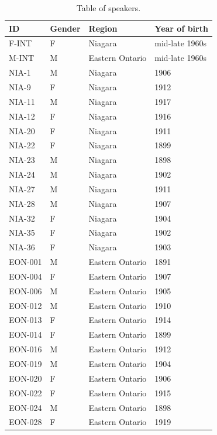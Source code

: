\documentclass[11pt]{article}
\begin{document}
\begin{table}[ht!]
    \centering
    \begin{tabular}{llll}
        \toprule
        ID & Gender & Region  & Year of birth \\
        \midrule
        F-INT   & F & Niagara         & mid-late 1960s \\
        M-INT   & M & Eastern Ontario & mid-late 1960s \\
        NIA-1   & M & Niagara         & 1906    \\
        NIA-9   & F & Niagara         & 1912    \\
        NIA-11  & M & Niagara         & 1917    \\
        NIA-12  & F & Niagara         & 1916    \\
        NIA-20  & F & Niagara         & 1911    \\
        NIA-22  & F & Niagara         & 1899    \\
        NIA-23  & M & Niagara         & 1898    \\
        NIA-24  & M & Niagara         & 1902    \\
        NIA-27  & M & Niagara         & 1911    \\
        NIA-28  & M & Niagara         & 1907    \\
        NIA-32  & F & Niagara         & 1904    \\
        NIA-35  & F & Niagara         & 1902    \\
        NIA-36  & F & Niagara         & 1903    \\
        EON-001 & M & Eastern Ontario & 1891    \\
        EON-004 & F & Eastern Ontario & 1907    \\
        EON-006 & M & Eastern Ontario & 1905    \\
        EON-012 & M & Eastern Ontario & 1910    \\
        EON-013 & F & Eastern Ontario & 1914    \\
        EON-014 & F & Eastern Ontario & 1899    \\
        EON-016 & M & Eastern Ontario & 1912    \\
        EON-019 & M & Eastern Ontario & 1904    \\
        EON-020 & F & Eastern Ontario & 1906    \\
        EON-022 & F & Eastern Ontario & 1915    \\
        EON-024 & M & Eastern Ontario & 1898    \\
        EON-028 & F & Eastern Ontario & 1919    \\
        \bottomrule
    \end{tabular}
    \caption{Table of speakers.}\label{tab:speakers}
\end{table}
\end{document}
